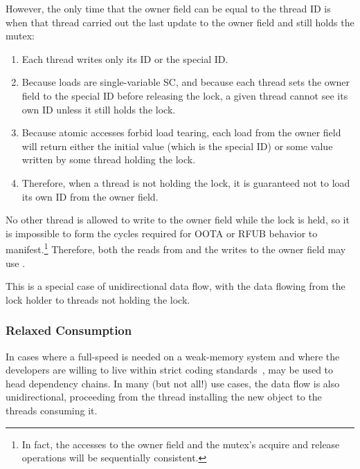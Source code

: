 \documentclass[10]{article}
\begin{document}
However, the only time that the owner field can be equal to the thread ID
is when that thread carried out the last update to the owner field and
still holds the mutex:

\begin{enumerate}
\item	Each thread writes only its ID or the special ID.
\item	Because  loads are single-variable
	SC, and because each thread sets the owner field to the special
	ID before releasing the lock, a given thread cannot see its own
	ID unless it still holds the lock.
\item	Because atomic accesses forbid load tearing, each load from
	the owner field will return either the initial value
	(which is the special ID) or some value written by some
	thread holding the lock.
\item	Therefore, when a thread is not holding the lock, it is guaranteed
	not to load its own ID from the owner field.
\end{enumerate}

No other thread is allowed to write to the owner field while the lock
is held, so it is impossible to form the cycles required for OOTA or
RFUB behavior to manifest.\footnote{
	In fact, the accesses to the owner field and the mutex's acquire
	and release operations will be sequentially consistent.}
Therefore, both the reads from and the writes to the owner field
may use .

This is a special case of unidirectional data flow, with the data flowing
from the lock holder to threads not holding the lock.


\subsubsection{Relaxed Consumption}
\label{sec:Relaxed Consumption}

In cases where a full-speed  is needed on a
weak-memory system and where the developers are willing to live within
strict coding standards~\cite{PaulEMcKenney2014rcu-dereference},
 may be used to head dependency chains.
In many (but not all!) use cases, the data flow is also unidirectional,
proceeding from the thread installing the new object to the threads
consuming it.
\end{document}
